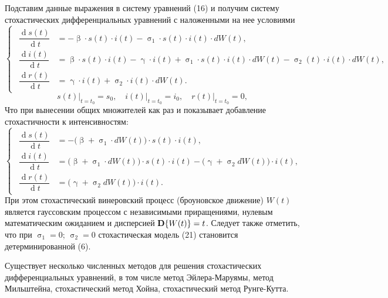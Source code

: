 \documentclass[a4paper, 12pt]{extarticle}
\numberwithin{equation}{section}
\renewcommand{\beta}{\upbeta}
\renewcommand{\gamma}{\upgamma}
\renewcommand{\sigma}{\upsigma}
\renewcommand{\d}{\operatorname{d}}
\begin{document}
	Подставим данные выражения в систему уравнений (16) и получим систему стохастических дифференциальных уравнений с наложенными на нее условиями\begin{equation}
		\left\{ 
		\begin{gathered} 
			\begin{aligned}
				\dfrac {\d s(t)}{\d t} &= -\beta \cdot s(t) \cdot i(t) -\sigma_1 \cdot s(t)\cdot i(t) \cdot dW(t),\\
				\dfrac{\d i(t)}{\d t} &= \beta \cdot s(t)\cdot i(t) - \gamma\cdot i(t) + \sigma_1 \cdot s(t)\cdot i(t) \cdot dW(t) - \sigma_2(t)\cdot i(t)\cdot dW(t),\\
				\dfrac{\d r(t)}{\d t} &= \gamma\cdot i(t) + \sigma_2 \cdot i(t) \cdot dW(t). 
			\end{aligned}
		\end{gathered} 
		\right.		
	\end{equation}
	\begin{equation}
		s(t)\Big|_{t=t_0} = s_0,\quad i(t)\Big|_{t=t_0} = i_0,\quad r(t)\Big|_{t=t_0} = 0,
	\end{equation}
	Что при вынесении общих множителей как раз и показывает добавление стохастичности к интенсивностям:
	\begin{equation}
		\left\{ 
		\begin{gathered} 
			\begin{aligned}
				\dfrac {\d s(t)}{\d t} &= -\Big(\beta +\sigma_1 \cdot dW(t)\Big)\cdot s(t)\cdot i(t) ,\\
				\dfrac{\d i(t)}{\d t} &= \Big(\beta +\sigma_1 \cdot dW(t)\Big) \cdot s(t)\cdot i(t) - \Big(\gamma + \sigma_2d W(t)\Big)\cdot i(t),\\
				\dfrac{\d r(t)}{\d t} &= \Big(\gamma + \sigma_2d W(t)\Big)\cdot i(t). 
			\end{aligned}
		\end{gathered} 
		\right.		
	\end{equation}
	При этом стохастический винеровский процесс (броуновское движение)
	$W (t)$ является гауссовским процессом с независимыми приращениями, нулевым
	математическим ожиданием и дисперсией $\textbf D \{W(t)\} = t$. Следует также отметить, что при $\sigma_1 = 0$; $\sigma_2 = 0$
	стохастическая модель (21) становится детерминированной (6). 
	
	Существует несколько численных методов для решения стохастических дифференциальных уравнений, в том числе
	метод Эйлера-Маруямы, метод Мильштейна, стохастический метод Хойна, стохастический
	метод Рунге-Кутта. 
	
\end{document}
